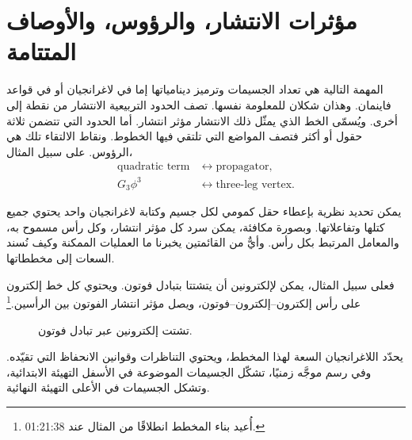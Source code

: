 \begin{classroomqa}
\end{classroomqa}

\section{مؤثرات الانتشار، والرؤوس، والأوصاف المتتامة}

المهمة التالية هي تعداد الجسيمات وترميز دينامياتها إما في لاغرانجيان أو في قواعد فاينمان. وهذان شكلان للمعلومة نفسها. تصف الحدود التربيعية الانتشار من نقطة إلى أخرى. ويُسمّى الخط الذي يمثّل ذلك الانتشار مؤثر انتشار. أما الحدود التي تتضمن ثلاثة حقول أو أكثر فتصف المواضع التي تلتقي فيها الخطوط. ونقاط الالتقاء تلك هي الرؤوس. على سبيل المثال،
\begin{equation}
\begin{aligned}
\text{quadratic term}
&\longleftrightarrow \text{propagator},\\
G_3\phi^3
&\longleftrightarrow \text{three-leg vertex}.
\end{aligned}
\end{equation}

يمكن تحديد نظرية بإعطاء حقل كمومي لكل جسيم وكتابة لاغرانجيان واحد يحتوي جميع كتلها وتفاعلاتها. وبصورة مكافئة، يمكن سرد كل مؤثر انتشار، وكل رأس مسموح به، والمعامل المرتبط بكل رأس. وأيٌّ من القائمتين يخبرنا ما العمليات الممكنة وكيف نُسند السعات إلى مخططاتها.

فعلى سبيل المثال، يمكن لإلكترونين أن يتشتتا بتبادل فوتون. ويحتوي كل خط إلكترون على رأس إلكترون--إلكترون--فوتون، ويصل مؤثر انتشار الفوتون بين الرأسين.\footnote{أُعيد بناء المخطط انطلاقًا من المثال عند 01:21:38.}

\begin{figure}[htbp]
\centering
{}
\caption{تشتت إلكترونين عبر تبادل فوتون.}
\end{figure}

يحدّد اللاغرانجيان السعة لهذا المخطط، ويحتوي التناظرات وقوانين الانحفاظ التي تقيّده. وفي رسم موجَّه زمنيًا، تشكّل الجسيمات الموضوعة في الأسفل التهيئة الابتدائية، وتشكل الجسيمات في الأعلى التهيئة النهائية.

